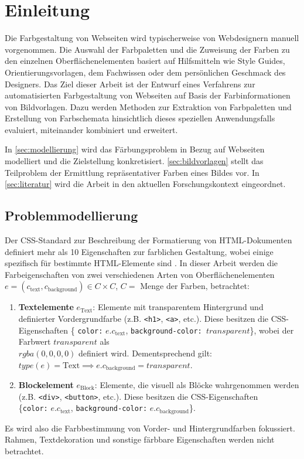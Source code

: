 \section{Einleitung}

Die Farbgestaltung von Webseiten wird typischerweise von Webdesignern manuell vorgenommen. Die Auswahl der Farbpaletten und die Zuweisung der Farben zu den einzelnen Oberflächenelementen basiert auf Hilfsmitteln wie Style Guides, Orientierungsvorlagen, dem Fachwissen oder dem persönlichen Geschmack des Designers. Das Ziel dieser Arbeit ist der Entwurf eines Verfahrens zur automatisierten Farbgestaltung von Webseiten auf Basis der Farbinformationen von Bildvorlagen. Dazu werden Methoden zur Extraktion von Farbpaletten und Erstellung von Farbschemata hinsichtlich dieses speziellen Anwendungsfalls evaluiert, miteinander kombiniert und erweitert.

In \autoref{sec:modellierung} wird das Färbungsproblem in Bezug auf Webseiten modelliert und die Zielstellung konkretisiert. \autoref{sec:bildvorlagen} stellt das Teilproblem der Ermittlung repräsentativer Farben eines Bildes vor. In \autoref{sec:literatur} wird die Arbeit in den aktuellen Forschungskontext eingeordnet.

\subsection{Problemmodellierung}
\label{sec:modellierung}

Der CSS-Standard zur Beschreibung der Formatierung von HTML-Dokumenten definiert mehr als 10 Eigenschaften zur farblichen Gestaltung, wobei einige spezifisch für bestimmte  HTML-Elemente sind  \citep{css3-color}. In dieser Arbeit werden die Farbeigenschaften von zwei verschiedenen Arten von Oberflächenelementen $e = (c_\text{text}, c_\text{background}) \in C \times C$, $C = $ Menge der Farben, betrachtet:
\begin{enumerate}
	\item \textbf{Textelemente} $e_\text{Text}$: Elemente mit transparentem Hintergrund und definierter Vordergrundfarbe (z.B. \texttt{<h1>}, \texttt{<a>}, etc.). Diese besitzen die CSS-Eigenschaften \{ \texttt{color:} $e.c_\text{text}$,  \texttt{background-color: }$transparent$\}, wobei der Farbwert $transparent$ als\\$rgba(0, 0, 0, 0)$ definiert wird. Dementsprechend gilt: $type(e) = \text{Text} \implies e.c_\text{background} = transparent$.\\
	\item  \textbf{Blockelement} $e_\text{Block}$: Elemente, die visuell als Blöcke wahrgenommen werden (z.B. \texttt{<div>}, \texttt{<button>}, etc.). Diese besitzen die CSS-Eigenschaften\\ \{\texttt{color:} $e.c_\text{text}$,  \texttt{background-color:} $e.c_\text{background}$\}.
\end{enumerate}
Es wird also die Farbbestimmung von Vorder- und Hintergrundfarben fokussiert. Rahmen, Textdekoration und sonstige färbbare Eigenschaften werden nicht betrachtet.

